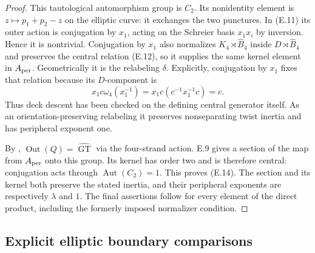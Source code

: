 \begin{proof}
This tautological automorphism group is $C_2$.  Its nonidentity
element is $z\mapsto p_1+p_2-z$ on the elliptic curve: it exchanges
the two punctures.  In (E.11) its outer action is conjugation by
$x_1$, acting on the Schreier basis $x_1x_i$ by inversion.  Hence
it is nontrivial.  Conjugation by $x_1$ also normalizes
$K_4\rtimes\widehat B_4$ inside $D\rtimes\widehat B_4$ and
preserves the central relation (E.12), so it supplies the same
kernel element in $A_{\rm per}$.  Geometrically it is the
relabeling $\delta$.  Explicitly, conjugation by $x_1$ fixes that
relation because its $D$-component is
\[
 x_1c\omega_4(x_1^{-1})
   =x_1c(c^{-1}x_1^{-1}c)=c.
\]
Thus deck descent has been checked on the defining central
generator itself.  As an orientation-preserving
relabeling it
preserves nonseparating twist inertia and has peripheral exponent
one.

By \cite[Theorem 4.3(i), Corollary C]{ET_MN2022},
$\operatorname{Out}(Q)=\widehat{\operatorname{GT}}$ via the
four-strand action.  E.9 gives a section of the map from
$A_{\rm per}$ onto this group.  Its kernel has order two and is
therefore central: conjugation acts through
$\operatorname{Aut}(C_2)=1$.  This proves (E.14).
The section and its kernel both preserve the stated inertia,
and their peripheral exponents are respectively $\lambda$ and
$1$.  The final assertions follow for every element of the direct
product, including the formerly imposed normalizer condition.
\end{proof}

\subsection{Explicit elliptic boundary comparisons}

